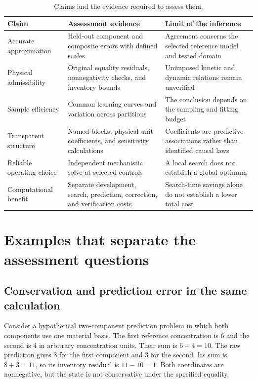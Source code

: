 \begin{table}[htbp]
\centering
\caption{Claims and the evidence required to assess them.}
\label{tab:claim_evidence}
\small
\begin{tabular}{p{}p{}p{}}
\toprule
Claim & Assessment evidence & Limit of the inference \\
\midrule
Accurate approximation & Held-out component and composite errors with defined scales & Agreement concerns the selected reference model and tested domain \\
Physical admissibility & Original equality residuals, nonnegativity checks, and inventory bounds & Unimposed kinetic and dynamic relations remain unverified \\
Sample efficiency & Common learning curves and variation across partitions & The conclusion depends on the sampling and fitting budget \\
Transparent structure & Named blocks, physical-unit coefficients, and sensitivity calculations & Coefficients are predictive associations rather than identified causal laws \\
Reliable operating choice & Independent mechanistic solve at selected controls & A local search does not establish a global optimum \\
Computational benefit & Separate development, search, prediction, correction, and verification costs & Search-time savings alone do not establish a lower total cost \\
\bottomrule
\end{tabular}
\end{table}

\section{Examples that separate the assessment questions}

\subsection{Conservation and prediction error in the same calculation}

Consider a hypothetical two-component prediction problem in which both components use one material basis. The first reference concentration is 6 and the second is 4 in arbitrary concentration units. Their sum is $6+4=10$. The raw prediction gives 8 for the first component and 3 for the second. Its sum is $8+3=11$, so its inventory residual is $11-10=1$. Both coordinates are nonnegative, but the state is not conservative under the specified equality.

